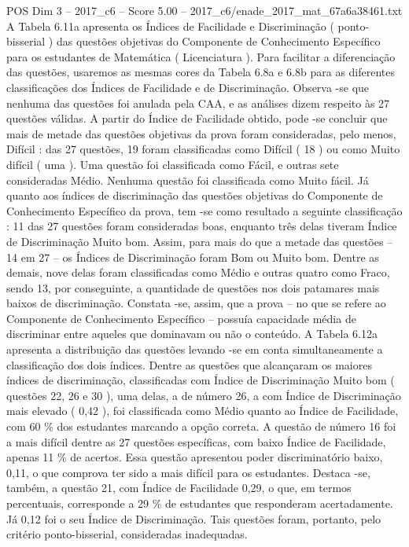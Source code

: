 \begin{textsample}{POS Dim 3 – 2017\_c6 – Score 5.00 – 2017\_c6/enade\_2017\_mat\_67a6a38461.txt}
A Tabela 6.11a apresenta os Índices de Facilidade e Discriminação ( ponto-bisserial ) das questões objetivas do Componente de Conhecimento Específico para os estudantes de Matemática ( Licenciatura ).
Para facilitar a diferenciação das questões, usaremos as mesmas cores da Tabela 6.8a e 6.8b para as diferentes classificações dos Índices de Facilidade e de Discriminação.
Observa -se que nenhuma das questões foi anulada pela CAA, e as análises dizem respeito às 27 questões válidas.
A partir do Índice de Facilidade obtido, pode -se concluir que mais de metade das questões objetivas da prova foram consideradas, pelo menos, Difícil : das 27 questões, 19 foram classificadas como Difícil ( 18 ) ou como Muito difícil ( uma ).
Uma questão foi classificada como Fácil, e outras sete consideradas Médio.
Nenhuma questão foi classificada como Muito fácil.
Já quanto aos índices de discriminação das questões objetivas do Componente de Conhecimento Específico da prova, tem -se como resultado a seguinte classificação : 11 das 27 questões foram consideradas boas, enquanto três delas tiveram Índice de Discriminação Muito bom.
Assim, para mais do que a metade das questões – 14 em 27 – os Índices de Discriminação foram Bom ou Muito bom.
Dentre as demais, nove delas foram classificadas como Médio e outras quatro como Fraco, sendo 13, por conseguinte, a quantidade de questões nos dois patamares mais baixos de discriminação.
Constata -se, assim, que a prova – no que se refere ao Componente de Conhecimento Específico – possuía capacidade média de discriminar entre aqueles que dominavam ou não o conteúdo.
A Tabela 6.12a apresenta a distribuição das questões levando -se em conta simultaneamente a classificação dos dois índices.
Dentre as questões que alcançaram os maiores índices de discriminação, classificadas com Índice de Discriminação Muito bom ( questões 22, 26 e 30 ), uma delas, a de número 26, a com Índice de Discriminação mais elevado ( 0,42 ), foi classificada como Médio quanto ao Índice de Facilidade, com 60 \% dos estudantes marcando a opção correta.
A questão de número 16 foi a mais difícil dentre as 27 questões específicas, com baixo Índice de Facilidade, apenas 11 \% de acertos.
Essa questão apresentou poder discriminatório baixo, 0,11, o que comprova ter sido a mais difícil para os estudantes.
Destaca -se, também, a questão 21, com Índice de Facilidade 0,29, o que, em termos percentuais, corresponde a 29 \% de estudantes que responderam acertadamente.
Já 0,12 foi o seu Índice de Discriminação.
Tais questões foram, portanto, pelo critério ponto-bisserial, consideradas inadequadas.

\end{textsample}
